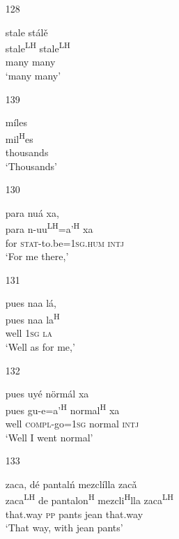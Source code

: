 \begin{itemize}
\item[128]
 
\glll   stale st\'{a}l\v{e} \\
stale\textsuperscript{LH} stale\textsuperscript{LH} \\
 many many \\
\glt `many many'
 



\item[139]
 
\glll   m\'{i}les \\
mil\textsuperscript{H}es \\
thousands \\
\glt `Thousands'
 

\item[130]
 
\glll   para nu\'{a} xa,  \\
para n-uu\textsuperscript{LH}=a'\textsuperscript{H} xa  \\
for \textsc{stat}-to.be=\textsc{1sg.hum} \textsc{intj} \\
\glt `For me there,'
 


\item[131]
 
\glll   pues naa l\'{a},  \\
pues naa la\textsuperscript{H} \\
well \textsc{1sg} \textsc{la} \\
\glt `Well as for me,'
 


\item[132]
 
\glll   pues uy\'{e} n\"{o}rm\'{a}l xa \\
pues gu-e=a'\textsuperscript{H} normal\textsuperscript{H} xa  \\
well \textsc{compl}-go=\textsc{1sg} normal \textsc{intj} \\
\glt `Well I went normal'
 


\item[133]
 
\glll   zaca, d\'{e} pantal\'{n} mezcl\'{i}lla zac\v{a} \\
zaca\textsuperscript{LH} de pantalon\textsuperscript{H} mezcli\textsuperscript{H}lla zaca\textsuperscript{LH} \\
that.way \textsc{pp} pants jean that.way \\
\glt `That way, with jean pants'
 



\end{itemize}
